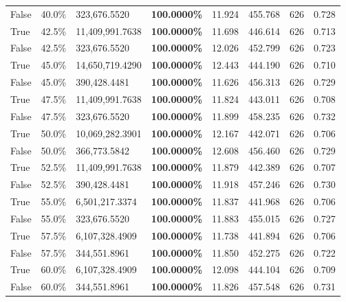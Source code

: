 \begin{table}[H]
\begin{tabular}{lllrllll}
\cline{1-8}
False & 40.0\% & 323,676.5520 & \bfseries \color{red} 100.0000\% & 11.924 & 455.768 & 626 & 0.728 \\
\cline{1-8}
True & 42.5\% & 11,409,991.7638 & \bfseries \color{red} 100.0000\% & 11.698 & 446.614 & 626 & 0.713 \\
\cline{1-8}
False & 42.5\% & 323,676.5520 & \bfseries \color{red} 100.0000\% & 12.026 & 452.799 & 626 & 0.723 \\
\cline{1-8}
True & 45.0\% & 14,650,719.4290 & \bfseries \color{red} 100.0000\% & 12.443 & 444.190 & 626 & 0.710 \\
\cline{1-8}
False & 45.0\% & 390,428.4481 & \bfseries \color{red} 100.0000\% & 11.626 & 456.313 & 626 & 0.729 \\
\cline{1-8}
True & 47.5\% & 11,409,991.7638 & \bfseries \color{red} 100.0000\% & 11.824 & 443.011 & 626 & 0.708 \\
\cline{1-8}
False & 47.5\% & 323,676.5520 & \bfseries \color{red} 100.0000\% & 11.899 & 458.235 & 626 & 0.732 \\
\cline{1-8}
True & 50.0\% & 10,069,282.3901 & \bfseries \color{red} 100.0000\% & 12.167 & 442.071 & 626 & 0.706 \\
\cline{1-8}
False & 50.0\% & 366,773.5842 & \bfseries \color{red} 100.0000\% & 12.608 & 456.460 & 626 & 0.729 \\
\cline{1-8}
True & 52.5\% & 11,409,991.7638 & \bfseries \color{red} 100.0000\% & 11.879 & 442.389 & 626 & 0.707 \\
\cline{1-8}
False & 52.5\% & 390,428.4481 & \bfseries \color{red} 100.0000\% & 11.918 & 457.246 & 626 & 0.730 \\
\cline{1-8}
True & 55.0\% & 6,501,217.3374 & \bfseries \color{red} 100.0000\% & 11.837 & 441.968 & 626 & 0.706 \\
\cline{1-8}
False & 55.0\% & 323,676.5520 & \bfseries \color{red} 100.0000\% & 11.883 & 455.015 & 626 & 0.727 \\
\cline{1-8}
True & 57.5\% & 6,107,328.4909 & \bfseries \color{red} 100.0000\% & 11.738 & 441.894 & 626 & 0.706 \\
\cline{1-8}
False & 57.5\% & 344,551.8961 & \bfseries \color{red} 100.0000\% & 11.850 & 452.275 & 626 & 0.722 \\
\cline{1-8}
True & 60.0\% & 6,107,328.4909 & \bfseries \color{red} 100.0000\% & 12.098 & 444.104 & 626 & 0.709 \\
\cline{1-8}
False & 60.0\% & 344,551.8961 & \bfseries \color{red} 100.0000\% & 11.826 & 457.548 & 626 & 0.731 \\

\end{tabular}
\end{table}

